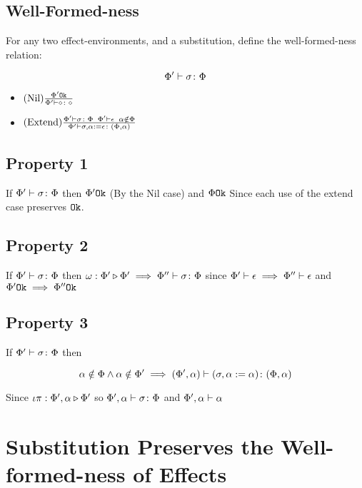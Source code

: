 {    \subsection{Well-Formed-ness }

    For any two effect-environments, and a substitution, define the well-formed-ness relation:

    \begin{equation}
        \Phi' \vdash \sigma \colon \Phi
    \end{equation}

    \begin{itemize}
        \item $(\text{Nil}) \frac{\Phi' \texttt{Ok}}{\Phi' \vdash \diamond \colon \diamond}$
        \item $(\text{Extend}) \frac{\Phi' \vdash \sigma \colon \Phi\;\;\Phi'\vdash \epsilon\;\;\alpha\notin\Phi}{\Phi' \vdash \sigma, \alpha :=\epsilon \colon (\Phi, \alpha)}$
    \end{itemize}

    \subsection{Property 1}
    If $\Phi' \vdash \sigma \colon \Phi$ then $\Phi' \texttt{Ok}$ (By  the 
    Nil case) and $\Phi \texttt{Ok}$ Since each use of the extend case preserves $\texttt{Ok}$.

    \subsection{Property 2}
    If $\Phi' \vdash \sigma \colon \Phi$ then $\omega : \Phi' \triangleright \Phi' \implies \Phi'' \vdash \sigma \colon \Phi$ since $\Phi'\vdash \epsilon\implies \Phi''\vdash \epsilon$ and $\Phi' \texttt{Ok}\implies \Phi'' \texttt{Ok}$


    \subsection{Property 3}
    If $\Phi' \vdash \sigma \colon \Phi$ then

    \begin{equation}
        \alpha\notin\Phi\wedge\alpha\notin\Phi' \implies (\Phi', \alpha) \vdash (\sigma, \alpha:=\alpha) \colon (\Phi,\alpha)
    \end{equation}

    Since $\iota\pi : \Phi',\alpha \triangleright \Phi'$ so $\Phi',\alpha \vdash \sigma \colon \Phi$ and $\Phi',\alpha\vdash \alpha$

    \section{Substitution Preserves the Well-formed-ness of Effects}

}
